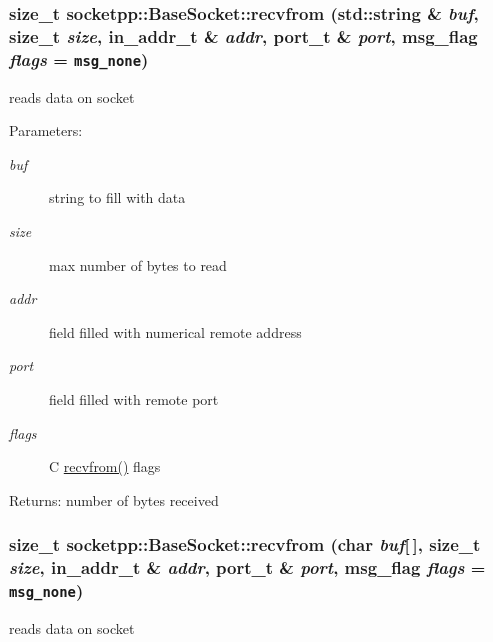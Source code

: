 \begin{CompactItemize}
{\subsubsection[{recvfrom}]{\setlength{\rightskip}{0pt plus 5cm}size\_\-t socketpp::BaseSocket::recvfrom (std::string \& {\em buf}, \/  size\_\-t {\em size}, \/  in\_\-addr\_\-t \& {\em addr}, \/  port\_\-t \& {\em port}, \/  msg\_\-flag {\em flags} = {\tt msg\_\-none})}}
\label{classsocketpp_1_1BaseSocket_8241347ca77942e2bb1449d117ac7248}


reads data on socket 

\begin{Desc}
\item[Parameters:]
\begin{description}
\item[{\em buf}]string to fill with data \item[{\em size}]max number of bytes to read \item[{\em addr}]field filled with numerical remote address \item[{\em port}]field filled with remote port \item[{\em flags}]C \hyperlink{classsocketpp_1_1BaseSocket_6a207860c0a1328dc05bea32bb62e81f}{recvfrom()} flags \end{description}
\end{Desc}
\begin{Desc}
\item[Returns:]number of bytes received \end{Desc}
\hypertarget{classsocketpp_1_1BaseSocket_6a207860c0a1328dc05bea32bb62e81f}{
\subsubsection[{recvfrom}]{\setlength{\rightskip}{0pt plus 5cm}size\_\-t socketpp::BaseSocket::recvfrom (char {\em buf}\mbox{[}$\,$\mbox{]}, \/  size\_\-t {\em size}, \/  in\_\-addr\_\-t \& {\em addr}, \/  port\_\-t \& {\em port}, \/  msg\_\-flag {\em flags} = {\tt msg\_\-none})}}
\label{classsocketpp_1_1BaseSocket_6a207860c0a1328dc05bea32bb62e81f}


reads data on socket 


\end{CompactItemize}
